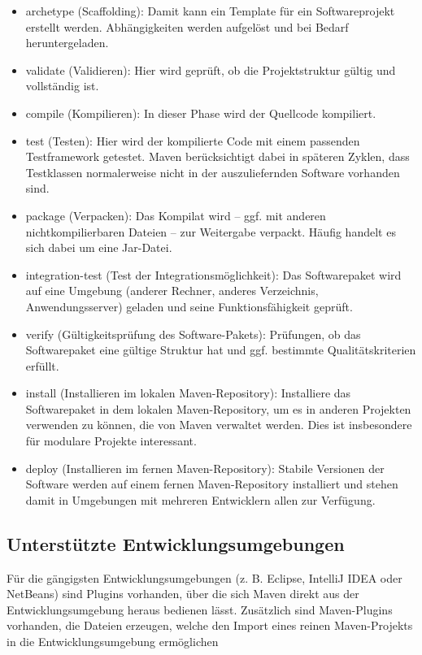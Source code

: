 \documentclass{article}
\begin{document}
\begin{itemize}
\item archetype (Scaffolding): Damit kann ein Template für ein Softwareprojekt erstellt werden. Abhängigkeiten werden aufgelöst und bei Bedarf heruntergeladen.
\item validate (Validieren): Hier wird geprüft, ob die Projektstruktur gültig und vollständig ist.
\item compile (Kompilieren): In dieser Phase wird der Quellcode kompiliert.
\item test (Testen): Hier wird der kompilierte Code mit einem passenden Testframework getestet. Maven berücksichtigt dabei in späteren Zyklen, dass Testklassen normalerweise nicht in der auszuliefernden Software vorhanden sind.
\item package (Verpacken): Das Kompilat wird – ggf. mit anderen nichtkompilierbaren Dateien – zur Weitergabe verpackt. Häufig handelt es sich dabei um eine Jar-Datei.
\item integration-test (Test der Integrationsmöglichkeit): Das Softwarepaket wird auf eine Umgebung (anderer Rechner, anderes Verzeichnis, Anwendungsserver) geladen und seine Funktionsfähigkeit geprüft.
\item verify (Gültigkeitsprüfung des Software-Pakets): Prüfungen, ob das Softwarepaket eine gültige Struktur hat und ggf. bestimmte Qualitätskriterien erfüllt.
\item install (Installieren im lokalen Maven-Repository): Installiere das Softwarepaket in dem lokalen Maven-Repository, um es in anderen Projekten verwenden zu können, die von Maven verwaltet werden. Dies ist insbesondere für modulare Projekte interessant.
\item deploy (Installieren im fernen Maven-Repository): Stabile Versionen der Software werden auf einem fernen Maven-Repository installiert und stehen damit in Umgebungen mit mehreren Entwicklern allen zur Verfügung.
\end{itemize}


\subsection{Unterstützte Entwicklungsumgebungen}
Für die gängigsten Entwicklungsumgebungen (z. B. Eclipse, IntelliJ IDEA oder NetBeans) sind Plugins vorhanden, über die sich Maven direkt aus der Entwicklungsumgebung heraus bedienen lässt. Zusätzlich sind Maven-Plugins vorhanden, die Dateien erzeugen, welche den Import eines reinen Maven-Projekts in die Entwicklungsumgebung ermöglichen 
\end{document}
